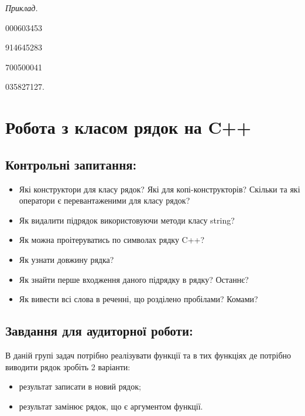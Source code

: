 \documentclass[a5paper,titlepage,openany,twoside,
]
{book_unv}%
\begin{document}
\begin{enumerate}
\begin{enumerate}
\emph{Приклад.}

000603453
 
914645283 

700500041 

035827127. 

\end{enumerate}




\chapter{Робота з класом рядок на C++}
%

\section{Контрольні запитання:}
\begin{itemize}
\item
  Які конструктори для класу рядок? Які для копі-конструкторів? Скільки та
  які оператори є перевантаженими для класу рядок?
\item
  Як видалити підрядок використовуючи методи класу string?
\item
  Як можна проітеруватись по символах рядку C++?
\item
  Як узнати довжину рядка?
\item
  Як знайти перше входження даного підрядку в рядку? Останнє?
\item
  Як вивести всі слова в реченні, що розділено пробілами? Комами?
\end{itemize}

\section{Завдання для аудиторної роботи:}

В даній групі задач потрібно реалізувати функції та в тих функціях де
потрібно виводити рядок зробіть 2 варіанти:
\begin{itemize}
\item
 результат записати в новий рядок; 
\item
 результат замінює рядок, що є аргументом функції.
\end{itemize}


\end{enumerate}
\end{document}
